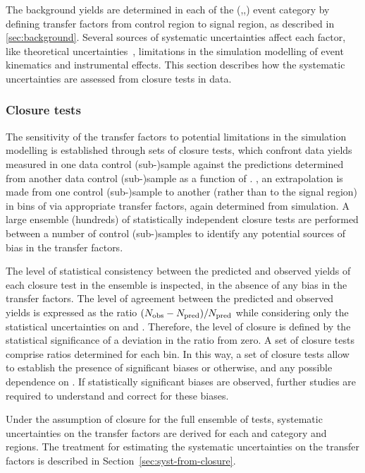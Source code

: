 The background yields are determined in each of the (\nb,\njet,\HT) event category 
by defining transfer factors from control region to signal region, as described in \ref{sec:background}. 
Several sources of systematic uncertainties affect each factor, like 
theoretical uncertainties~\cite{Bern:2011pa}, 
limitations in the simulation modelling of event kinematics and
instrumental effects. This section describes how the systematic
uncertainties are assessed from closure tests in data.

\subsubsection{Closure tests\label{sec:closure-tests-desc}}

The sensitivity of the transfer factors to potential limitations in
the simulation modelling is established through sets of closure tests,
which confront data yields measured in one data control (sub-)sample
against the predictions determined from another data control
(sub-)sample as a function of \scalht. \ie, an extrapolation is made
from one control (sub-)sample to another (rather than to the signal
region) in bins of \scalht via appropriate transfer factors, again
determined from simulation. A large ensemble (\ie hundreds) of
statistically independent closure tests are performed between a number
of control (sub-)samples to identify any potential sources of bias in
the transfer factors.

The level of statistical consistency between the predicted and
observed yields of each closure test in the ensemble is inspected, in
the absence of any bias in the transfer factors. The level of
agreement between the predicted and observed yields is expressed as
the ratio $(N_{\textrm{obs}} - N_{\textrm{pred}})/N_{\textrm{pred}}$ while considering only the
statistical uncertainties on \npre and \nobs. Therefore, the level of
closure is defined by the statistical significance of a deviation in
the ratio from zero. A set of closure tests comprise ratios determined
for each \scalht bin. In this way, a set of closure tests allow to
establish the presence of significant biases or otherwise, and any
possible dependence on \scalht. If statistically significant biases
are observed, further studies are required to understand and correct
for these biases.

Under the assumption of closure for the full ensemble of tests,
systematic uncertainties on the transfer factors are derived for each
\njet and \nb category and \scalht regions. The treatment for
estimating the systematic uncertainties on the transfer factors is
described in Section~\ref{sec:syst-from-closure}.

